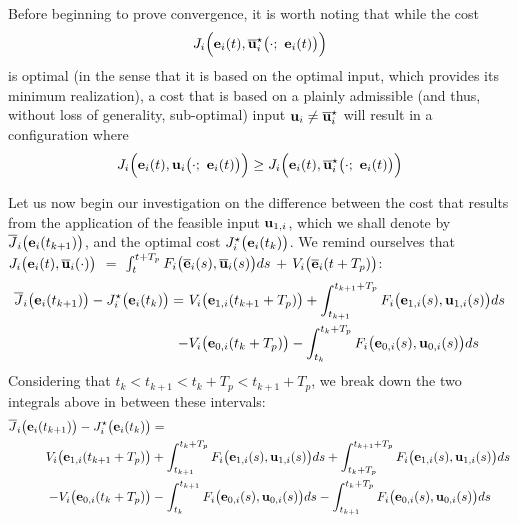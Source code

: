 Before beginning to prove convergence, it is worth noting that while the cost
$$J_i \Big(\vect{e}_i(t), \overline{\vect{u}}_i^{\star}\big(\cdot;\ \vect{e}_i(t)\big)\Big)$$
is optimal (in the sense that it is based on the optimal input, which provides
its minimum realization), a cost that is based on a plainly admissible
(and thus, without loss of generality, sub-optimal) input
$\bm{\mathbf{u}}_i \not= \overline{\bm{\mathbf{u}}}_i^{\star}$ will result in a configuration where
\begin{equation}
J_i \Big(\vect{e}_i(t), \vect{u}_i\big(\cdot;\ \vect{e}_i(t)\big)\Big)
\geq J_i \Big(\vect{e}_i(t), \overline{\vect{u}}_i^{\star}\big(\cdot;\ \vect{e}_i(t)\big)\Big)
\end{equation}

Let us now begin our investigation on the difference between the cost
that results from the application of the feasible input $\bm{\mathbf{u}}_{1,i}$,
which we shall denote by $\overline{J}_i\big(\bm{\mathbf{e}}_i(t_{k+1})\big)$,
and the optimal cost $J_i^{\star}\big(\bm{\mathbf{e}}_i(t_k)\big)$. We remind
ourselves that
$J_i \big(\bm{\mathbf{e}}_i(t), \overline{\bm{\mathbf{u}}}_i (\cdot)\big)$ $=$
$\int_{t}^{t + T_p} F_i \big(\overline{\bm{\mathbf{e}}}_i(s), \overline{\bm{\mathbf{u}}}_i (s)\big) ds$ $+$
$V_i \big(\overline{\bm{\mathbf{e}}}_i (t + T_p)\big)$:
\begin{align}
  \overline{J}_i\big(\bm{\mathbf{e}}_i(t_{k+1})\big) - J_i^{\star}\big(\bm{\mathbf{e}}_i(t_k)\big) =\
   & V_i \big(\bm{\mathbf{e}}_{1,i} (t_{k+1} + T_p)\big) + \int_{t_{k+1}}^{t_{k+1} + T_p} F_i \big(\bm{\mathbf{e}}_{1,i}(s), \bm{\mathbf{u}}_{1,i} (s)\big) ds \\
  -&V_i \big(\bm{\mathbf{e}}_{0,i} (t_k + T_p)\big) - \int_{t_k}^{t_k + T_p} F_i \big(\bm{\mathbf{e}}_{0,i}(s), \bm{\mathbf{u}}_{0,i} (s)\big) ds
\end{align}
Considering that $t_k < t_{k+1} < t_k + T_p < t_{k+1} + T_p$, we break down the
two integrals above in between these intervals:
\begin{align}
  \overline{J}_i\big(\bm{\mathbf{e}}_i(t_{k+1})\big) - J_i^{\star}\big(\bm{\mathbf{e}}_i(t_k)\big) &= \\
    V_i \big(\bm{\mathbf{e}}_{1,i} (t_{k+1} + T_p)\big)
    &+ \int_{t_{k+1}}^{t_k + T_p} F_i \big(\bm{\mathbf{e}}_{1,i}(s), \bm{\mathbf{u}}_{1,i} (s)\big) d s
    + \int_{t_k + T_p}^{t_{k+1} + T_p} F_i \big(\bm{\mathbf{e}}_{1,i}(s), \bm{\mathbf{u}}_{1,i} (s)\big) d s \\
    -V_i \big(\bm{\mathbf{e}}_{0,i} (t_k + T_p)\big)
    &- \int_{t_k}^{t_{k+1}} F_i \big(\bm{\mathbf{e}}_{0,i}(s), \bm{\mathbf{u}}_{0,i} (s)\big) d s
    - \int_{t_{k+1}}^{t_k + T_p} F_i \big(\bm{\mathbf{e}}_{0,i}(s), \bm{\mathbf{u}}_{0,i} (s)\big) d s
\label{eq:convergence_4_integrals}
\end{align}

